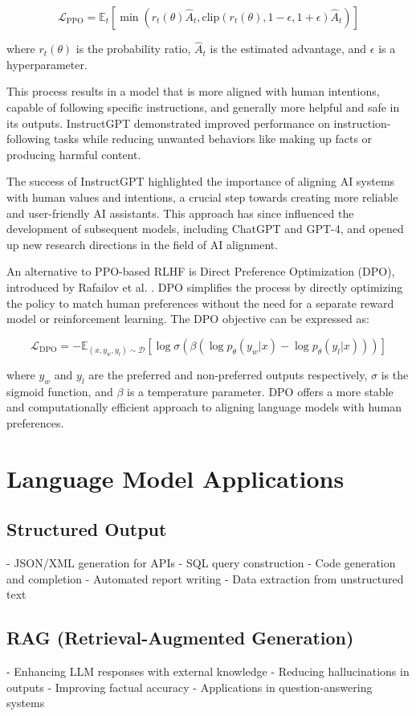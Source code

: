 \documentclass[a4paper, oneside]{discothesis}
\begin{document}
   \[\mathcal{L}_{\text{PPO}} = \mathbb{E}_t[\min(r_t(\theta)\hat{A}_t, \text{clip}(r_t(\theta), 1-\epsilon, 1+\epsilon)\hat{A}_t)]\]

   where $r_t(\theta)$ is the probability ratio, $\hat{A}_t$ is the estimated advantage, and $\epsilon$ is a hyperparameter.

This process results in a model that is more aligned with human intentions, capable of following specific instructions, and generally more helpful and safe in its outputs. InstructGPT demonstrated improved performance on instruction-following tasks while reducing unwanted behaviors like making up facts or producing harmful content.

The success of InstructGPT highlighted the importance of aligning AI systems with human values and intentions, a crucial step towards creating more reliable and user-friendly AI assistants. This approach has since influenced the development of subsequent models, including ChatGPT and GPT-4, and opened up new research directions in the field of AI alignment.

An alternative to PPO-based RLHF is Direct Preference Optimization (DPO), introduced by Rafailov et al. \cite{rafailov2023direct}. DPO simplifies the process by directly optimizing the policy to match human preferences without the need for a separate reward model or reinforcement learning. The DPO objective can be expressed as:

\[\mathcal{L}_{\text{DPO}} = -\mathbb{E}_{(x,y_w,y_l)\sim \mathcal{D}}[\log \sigma(\beta(\log p_\theta(y_w|x) - \log p_\theta(y_l|x)))]\]

where $y_w$ and $y_l$ are the preferred and non-preferred outputs respectively, $\sigma$ is the sigmoid function, and $\beta$ is a temperature parameter. DPO offers a more stable and computationally efficient approach to aligning language models with human preferences.

\section{Language Model Applications}
\subsection{Structured Output}
- JSON/XML generation for APIs
- SQL query construction
- Code generation and completion
- Automated report writing
- Data extraction from unstructured text

\subsection{RAG (Retrieval-Augmented Generation)}
- Enhancing LLM responses with external knowledge
- Reducing hallucinations in outputs
- Improving factual accuracy
- Applications in question-answering systems
\end{document}
